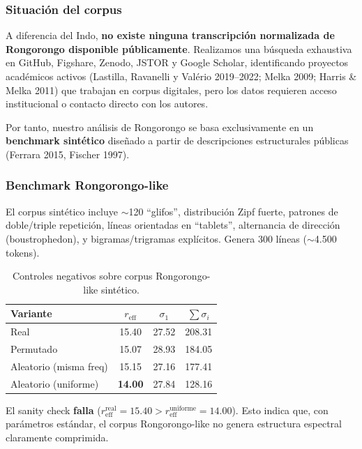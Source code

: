 \documentclass[11pt,a4paper]{article}
\newcommand{\1}{\mathbf{1}}
\numberwithin{equation}{section}
\begin{document}
\subsubsection{Situación del corpus}

A diferencia del Indo, \textbf{no existe ninguna transcripción normalizada de Rongorongo disponible públicamente}. Realizamos una búsqueda exhaustiva en GitHub, Figshare, Zenodo, JSTOR y Google Scholar, identificando proyectos académicos activos (Lastilla, Ravanelli y Valério 2019--2022; Melka 2009; Harris \& Melka 2011) que trabajan en corpus digitales, pero los datos requieren acceso institucional o contacto directo con los autores.

Por tanto, nuestro análisis de Rongorongo se basa exclusivamente en un \textbf{benchmark sintético} diseñado a partir de descripciones estructurales públicas (Ferrara 2015, Fischer 1997).

\subsubsection{Benchmark Rongorongo-like}

El corpus sintético incluye $\sim$120 ``glifos'', distribución Zipf fuerte, patrones de doble/triple repetición, líneas orientadas en ``tablets'', alternancia de dirección (boustrophedon), y bigramas/trigramas explícitos. Genera 300 líneas ($\sim$4.500 tokens).

\begin{table}[h]
\centering
\caption{Controles negativos sobre corpus Rongorongo-like sintético.}
\label{tab:rongorongo}
\begin{tabular}{lccc}
\toprule
Variante & $r_{\text{eff}}$ & $\sigma_1$ & $\sum \sigma_i$ \\
\midrule
Real & 15.40 & 27.52 & 208.31 \\
Permutado & 15.07 & 28.93 & 184.05 \\
Aleatorio (misma freq) & 15.15 & 27.16 & 177.41 \\
Aleatorio (uniforme) & \textbf{14.00} & 27.84 & 128.16 \\
\bottomrule
\end{tabular}
\end{table}

El sanity check \textbf{falla} ($r_{\text{eff}}^{\text{real}} = 15.40 > r_{\text{eff}}^{\text{uniforme}} = 14.00$). Esto indica que, con parámetros estándar, el corpus Rongorongo-like no genera estructura espectral claramente comprimida.
\end{document}
